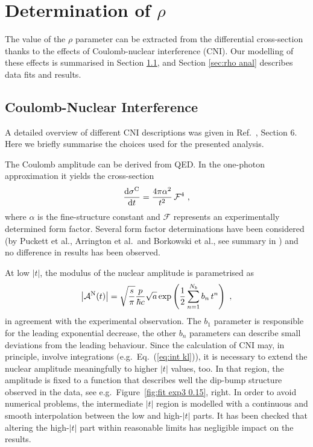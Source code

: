 \section{Determination of $\rho$}
\label{sec:rho}

The value of the $\rho$ parameter can be extracted from the differential cross-section thanks to the effects of Coulomb-nuclear interference (CNI). Our modelling of these effects is summarised in Section \ref{sec:rho cni}, and Section \ref{sec:rho anal} describes data fits and results.

\subsection{Coulomb-Nuclear Interference}
\label{sec:rho cni}

A detailed overview of different CNI descriptions was given in Ref.~\cite{totem-8tev-1km}, Section 6. Here we briefly summarise the choices used for the presented analysis.

The Coulomb amplitude can be derived from QED. In the one-photon approximation it yields the cross-section
\begin{equation}
\label{eq:coul cs}
	{{\rm d}\sigma^{\rm C}\over {\rm d}t} = {4\pi\alpha^2\over t^2}\,{\mathcal{F}}^4\ ,
\end{equation}
where $\alpha$ is the fine-structure constant and $\mathcal{F}$ represents an experimentally determined form factor. Several form factor determinations have been considered (by Puckett et al., Arrington et al.~and Borkowski et al., see summary in \cite{elegent}) and no difference in results has been observed.

At low $|t|$, the modulus of the nuclear amplitude is parametrised as
\begin{equation}
\label{eq:nuc mod}
\left | {\cal A}^{\rm N}(t) \right | = \sqrt{s\over\pi} {p\over \hbar c} \sqrt{a} \exp\left( {1\over 2} \sum\limits_{n = 1}^{N_b} b_n\, t^n \right)\ ,
\end{equation}
in agreement with the experimental observation. The $b_1$ parameter is responsible for the leading exponential decrease, the other $b_n$ parameters can describe small deviations from the leading behaviour. Since the calculation of CNI may, in principle, involve integrations (e.g.~Eq.~(\ref{eq:int kl})), it is necessary to extend the nuclear amplitude meaningfully to higher $|t|$ values, too. In that region, the amplitude is fixed to a function that describes well the dip-bump structure observed in the data, see e.g.~Figure~\ref{fig:fit exp3 0.15}, right. In order to avoid numerical problems, the intermediate $|t|$ region is modelled with a continuous and smooth interpolation between the low and high-$|t|$ parts. It has been checked that altering the high-$|t|$ part within reasonable limits has negligible impact on the results.

